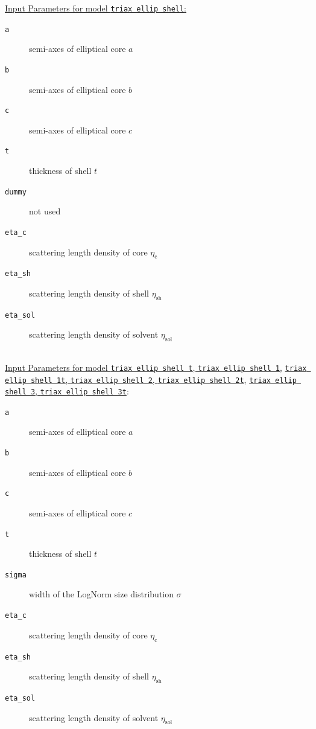 \vspace{3cm}
\noindent \uline{Input Parameters for model \texttt{triax ellip shell}:}
\begin{description}
\item[\texttt{a}] semi-axes of elliptical core $a$
\item[\texttt{b}] semi-axes of elliptical core $b$
\item[\texttt{c}] semi-axes of elliptical core $c$
\item[\texttt{t}] thickness of shell $t$
\item[\texttt{dummy}] not used
\item[\texttt{eta\_c}] scattering length density of core $\eta_\text{c}$
\item[\texttt{eta\_sh}] scattering length density of shell $\eta_\text{sh}$
\item[\texttt{eta\_sol}] scattering length density of solvent $\eta_\text{sol}$
\end{description}
~\\
\uline{Input Parameters for model \texttt{triax ellip shell t}, \texttt{triax ellip shell 1},}
\uline{\texttt{triax ellip shell 1t}, \texttt{triax ellip shell 2}, \texttt{triax ellip shell 2t},}
\uline{\texttt{triax ellip shell 3}, \texttt{triax ellip shell 3t}}:
\begin{description}
\item[\texttt{a}] semi-axes of elliptical core $a$
\item[\texttt{b}] semi-axes of elliptical core $b$
\item[\texttt{c}] semi-axes of elliptical core $c$
\item[\texttt{t}] thickness of shell $t$
\item[\texttt{sigma}] width of the LogNorm size distribution $\sigma$
\item[\texttt{eta\_c}] scattering length density of core $\eta_\text{c}$
\item[\texttt{eta\_sh}] scattering length density of shell $\eta_\text{sh}$
\item[\texttt{eta\_sol}] scattering length density of solvent $\eta_\text{sol}$
\end{description}

